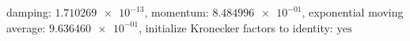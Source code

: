damping: $\num[scientific-notation=true]{1.710269e-13}$, momentum: $\num[scientific-notation=true]{8.484996e-01}$, exponential moving average: $\num[scientific-notation=true]{9.636460e-01}$, initialize Kronecker factors to identity: $\text{yes}$